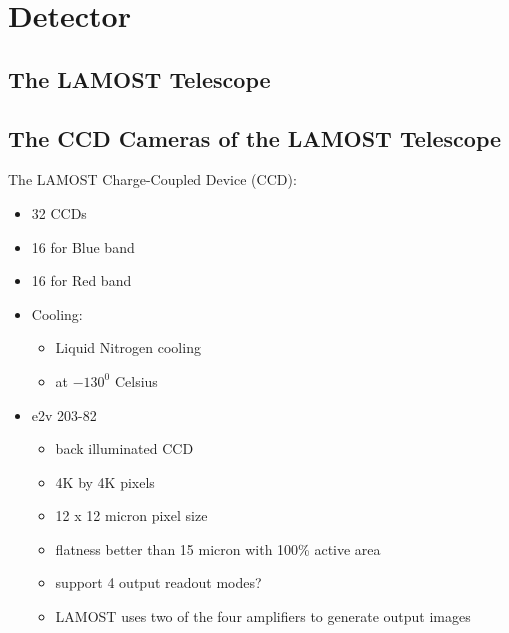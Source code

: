 \documentclass[12pt,twoside,letterpaper]{article}
\begin{document}
\section{Detector} 

\subsection{The LAMOST Telescope} 

\subsection{The CCD Cameras of the LAMOST Telescope} 

The LAMOST Charge-Coupled Device (CCD):
       \begin{itemize}
           \item 32 CCDs
	   \item 16 for Blue band 
	   \item 16 for Red  band
	   \item Cooling:
	   \begin{itemize}
	       \item Liquid Nitrogen cooling
	       \item at ${-130^{0}}$ Celsius
	   \end{itemize}
	   \item e2v 203-82 
	   \begin{itemize}
	       \item back illuminated CCD
	       \item 4K by 4K pixels
	       \item 12 x 12 micron pixel size
	       \item flatness better than 15 micron with 100\% active area 
	       \item support 4 output readout modes?
	       \item LAMOST uses two  of the four amplifiers to generate output images
	   \end{itemize}
       \end{itemize}
\end{document}
